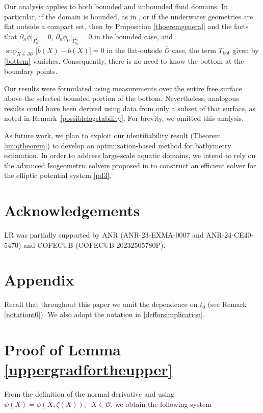 \documentclass[11pt]{article}
\begin{document}
Our analysis applies to both bounded and unbounded fluid domains. In particular, if the domain is bounded, as in \cite{lecaros2020stability}, or if the underwater geometries are flat outside a compact set, then by Proposition \ref{thoeremgeneral} and the facts that
\(\partial_{ n}\phi\big|_{\Gamma_b^{\zeta}}=0\), \(\partial_{ n}\phi_{0}\big|_{\Gamma_{b_0}^{\zeta_0}}=0\) in the bounded case, and
\(\sup_{X\in \partial \mathcal O}\big[\overline{b}(X)-b(X)\big]=0\) in the flat-outside $\overline{\mathcal{O}}$  case, the term \(T_{\mathrm{bot}}\) given by \eqref{bottem}  vanishes. Consequently, there is no need to know the bottom at the boundary points.


Our results were formulated using measurements over the entire free surface above the selected bounded portion of the bottom. Nevertheless, analogous results could have been derived using data from only a subset of that surface, as noted in Remark~\ref{possiblelogstability}. For brevity, we omitted this analysis.


As future work, we plan to exploit our identifiability result (Theorem \ref{uniqtheorem}) to develop an optimization-based method for bathymetry estimation. In order to address large-scale aquatic domains, we intend to rely on the advanced Isogeometric solvers proposed in \cite{meHendrik,montardini2025isogeometric} to construct an efficient solver for the elliptic potential system \eqref{pd3}.





\section*{Acknowledgements}
 LR was partially supported by ANR (ANR-23-EXMA-0007 and ANR-24-CE40-5470) and COFECUB (COFECUB-20232505780P).


\section*{Appendix}
Recall that throughout this paper we omit the dependence on \(t_0\) (see Remark \ref{notationt0}). We also adopt the notation in \eqref{defforsimplication}. 
\appendix
\section{Proof of Lemma \ref{uppergradfortheupper} }\label{A.1}
From  the definition of the normal derivative and using $\psi(X)=\phi(X,\zeta(X)),\;\; X\in \mathcal O $, we obtain the following system
\end{document}
